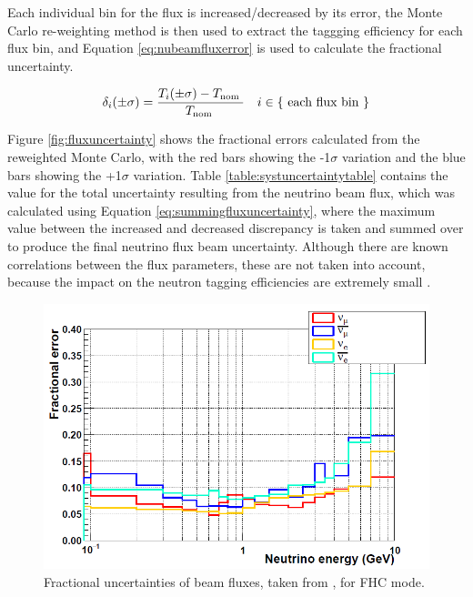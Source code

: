 Each individual bin for the flux is increased/decreased by its error, the Monte Carlo re-weighting method is then used to extract the taggging efficiency for each flux bin, and Equation \ref{eq:nubeamfluxerror} is used to calculate the fractional uncertainty.

\begin{equation}
\centering 
\delta_{i}(\pm \sigma)=\frac{T_{i}(\pm \sigma)-T_{\text {nom }}}{T_{\text {nom }}} \quad i \in\{\text { each flux bin }\}
\label{eq:nubeamfluxerror}
\end{equation}


Figure \ref{fig:fluxuncertainty} shows the fractional errors calculated from the reweighted Monte Carlo, with the red bars showing the -1$\sigma$ variation and the blue bars showing the +1$\sigma$ variation. Table \ref{table:systuncertaintytable} contains the value for the total uncertainty resulting from the neutrino beam flux, which was calculated using Equation \ref{eq:summingfluxuncertainty}, where the maximum value between the increased and decreased discrepancy is taken and summed over to produce the final neutrino flux beam uncertainty.
Although there are known correlations between the flux parameters, these are not taken into account, because the impact on the neutron tagging efficiencies are extremely small \cite{akutsu_thesis}.
\newline

\begin{figure}[!htb]
    \includegraphics[width=\textwidth]{Figures/frac_beam_flux_uncertainty.png}
    \caption{Fractional uncertainties of beam fluxes, taken from \cite{tn415_fiacob}, for FHC mode. }
    \label{fig:frac_beam_flux_uncertainty}
\end{figure}


